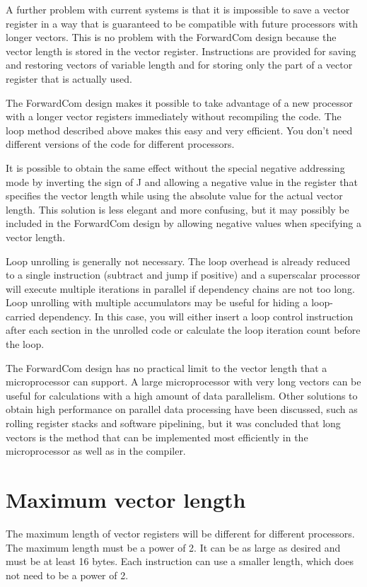 \documentclass[forwardcom.tex]{subfiles}
\begin{document}
A further problem with current systems is that it is impossible to save a vector register in a way that is guaranteed to be compatible with future processors with longer vectors. This is no problem with the ForwardCom design because the vector length is stored in the vector register. Instructions are provided for saving and restoring vectors of variable length and for storing only the part of a vector register that is actually used.
\vspace{2mm}

The ForwardCom design makes it possible to take advantage of a new processor with a longer vector registers immediately without recompiling the code. The loop method described above makes this easy and very efficient. You don't need different versions of the code for different processors.
\vspace{2mm}

It is possible to obtain the same effect without the special negative addressing mode by inverting the sign of J and allowing a negative value in the register that specifies the vector length while using the absolute value for the actual vector length. This solution is less elegant and more confusing, but it may possibly be included in the ForwardCom design by allowing negative values when specifying a vector length.
\vspace{2mm}

Loop unrolling is generally not necessary. The loop overhead is already reduced to a single instruction (subtract and jump if positive) and a superscalar processor will execute multiple iterations in parallel if dependency chains are not too long. Loop unrolling with multiple accumulators may be useful for hiding a loop-carried dependency. In this case, you will either insert a loop control instruction after each section in the unrolled code or calculate the loop iteration count before the loop.
\vspace{2mm}

The ForwardCom design has no practical limit to the vector length that a microprocessor can support. A large microprocessor with very long vectors can be useful for calculations with a high amount of data parallelism. Other solutions to obtain high performance on parallel data processing have been discussed, such as rolling register stacks and software pipelining, but it was concluded that long vectors is the method that can be implemented most efficiently in the microprocessor as well as in the compiler.

\section{Maximum vector length}
The maximum length of vector registers will be different for different processors. The maximum length must be a power of 2. It can be as large as desired and must be at least 16 bytes. Each instruction can use a smaller length, which does not need to be a power of 2.
\vspace{2mm}
\end{document}
